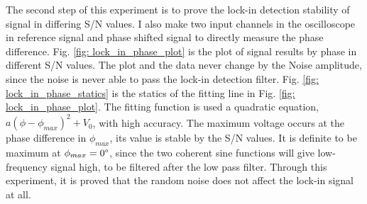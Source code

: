\documentclass{article}
\begin{document}
 The second step of this experiment is to prove the lock-in detection stability of signal in differing S/N values.
 I also make two input channels in the oscilloscope in reference signal and phase shifted signal to directly measure the phase difference.
 Fig. \ref{fig: lock_in_phase_plot} is the plot of signal results by phase in different S/N values.
 The plot and the data never change by the Noise amplitude, since the noise is never able to pass the lock-in detection filter.
 Fig. \ref{fig: lock_in_phase_statics} is the statics of the fitting line in Fig. \ref{fig: lock_in_phase_plot}.
 The fitting function is used a quadratic equation, $a(\phi - \phi_{max})^2 + V_0$, with high accuracy.
 The maximum voltage occurs at the phase difference in $\phi_{max}$, its value is stable by the S/N values.
 It is definite to be maximum at $\phi_{max}=0 \degree$, since the two coherent sine functions will give low-frequency signal high,
 to be filtered after the low pass filter.
 Through this experiment, it is proved that the random noise does not affect the lock-in signal at all.
 
\end{document}
